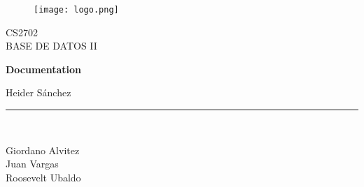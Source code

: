 \documentclass{article}
\begin{document}
\begin{titlepage}

\begin{center}
\begin{figure}[htb]
\begin{center}
\texttt{[image: logo.png]}
\end{center}
\end{figure}

\vspace{1cm}
CS2702 \\
BASE DE DATOS II\\
\vspace{1.5cm}

\vspace*{0.2in}
\begin{Large}
\textbf{Documentation} \\
\end{Large}
\vspace*{0.3in}
\begin{large}
Heider Sánchez \\
\end{large}
\vspace*{0.3in}
\rule{80mm}{0.1mm}\\
\vspace*{0.1in}
\begin{large}
Giordano Alvitez\\
Juan Vargas \\
Roosevelt Ubaldo \\
\end{large}
\end{center}
\end{titlepage}

\tableofcontents
\newpage
\end{document}
